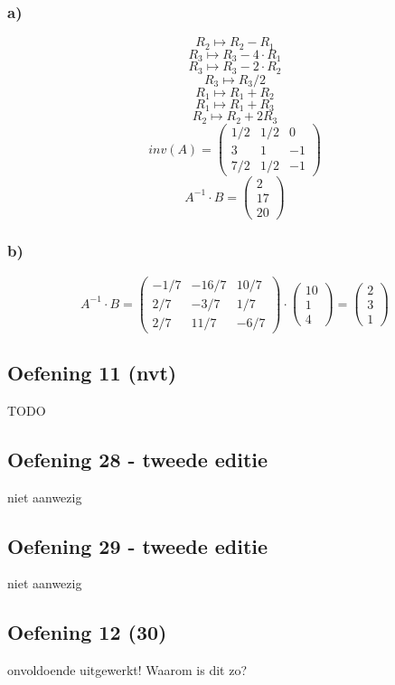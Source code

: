 \documentclass[lineaire_algebra_oplossingen.tex]{subfiles}
\begin{document}
\subsubsection*{a)}
\[R_2 \longmapsto R_2 - R_1 \]
\[R_3 \longmapsto R_3 -4\cdot R_1 \]
\[R_3 \longmapsto R_3 -2\cdot R_2 \]
\[R_3 \longmapsto R_3/2 \]
\[R_1 \longmapsto R_1 + R_2 \]
\[R_1 \longmapsto R_1 + R_3 \]
\[R_2 \longmapsto R_2 + 2R_3 \]
\[inv(A) = 
\begin{pmatrix}
1/2 & 1/2 & 0\\
3 & 1 & -1\\
7/2 & 1/2 & -1
\end{pmatrix}
\]
\[A^{-1} \cdot B = 
\begin{pmatrix}
2\\
17\\
20
\end{pmatrix}
\]
\subsubsection*{b)}
\[A^{-1} \cdot B = 
\begin{pmatrix}
-1/7 & -16/7 & 10/7\\
2/7 & -3/7 & 1/7\\
2/7 & 11/7 & -6/7
\end{pmatrix}
\cdot
\begin{pmatrix}
10\\
1\\
4
\end{pmatrix}
=
\begin{pmatrix}
2\\
3\\
1
\end{pmatrix}
\]

\subsection{Oefening 11 (nvt)}
TODO

\subsection{Oefening 28 - tweede editie}
niet aanwezig

\subsection{Oefening 29 - tweede editie}
niet aanwezig 

\subsection{Oefening 12 (30) }
onvoldoende uitgewerkt! Waarom is dit zo? 
\end{document}

